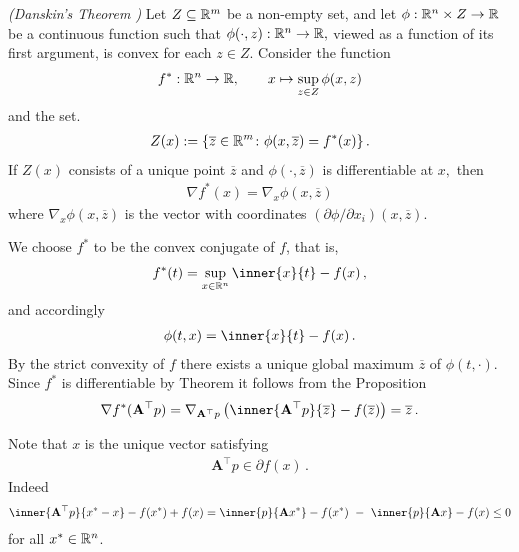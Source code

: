 \begin{proposition*}
  \emph{(Danskin's Theorem \cite[page 649]{Bertsekas2003})}
  Let 
  $
    Z \subseteq \mathbb{R}^m
  $
  be a non-empty set, 
  and let 
  $
    \phi :
    \mathbb{R}^n \times Z \to \mathbb{R}
  $
  be a continuous function such that
  $
    \phi(\cdot,z)
    :
    \mathbb{R}^n \to \mathbb{R},
  $
  viewed as a function of its first argument, 
  is convex for each 
  $
    z \in Z.
  $
  Consider the function
  \begin{gather}
    f^*:\mathbb{R}^n \to \mathbb{R}
    ,
    \qquad
    x\mapsto
    \sup_{z\in Z}
    \phi(x,z)
  \end{gather}
  and
  the set.
  \begin{gather}
    Z(x)
    :=
    \left\{ 
      \overline{z} \in \mathbb{R}^m
      \colon
      \phi(x, \overline{z})
      =
      f^*(x)
  \right\}
  .
  \end{gather}
  If $Z(x)$ consists of a unique point 
  $\overline{z}$
  and
  $
    \phi(\cdot, \overline{z})
  $
  is differentiable at $x,$
  then
  \begin{gather}
    \nabla f^*(x)
    =
    \nabla_x
    \phi(x,\overline{z})
  \end{gather}
  where 
  $
    \nabla_x
    \phi(x,\overline{z})
  $
  is the vector with coordinates
  $
    (\partial \phi / \partial x_i)
    (x,\overline{z})
  $.
\end{proposition*}
\begin{example*}
  We choose $f^*$ to be the convex conjugate of $f$, that is,
  \begin{gather}
    f^*(t)
    =
    \sup_{x\in\R^n}
    \inner{x}{t}-f(x)
    \,,
  \end{gather}
  and accordingly
  \begin{gather}
    \phi
    (t,x)
    =
    \inner{x}{t}-f(x)
    \,.
  \end{gather}
  By the strict convexity of $f$ there exists a unique
  global maximum $\overline{z}$ of $\phi(t,\cdot)$. 
  Since $f^*$ is differentiable by Theorem
  it follows from the Proposition
  \begin{gather}
    \nabla f^*(\mathbf{A}^\top p)
    =
    \nabla_{\mathbf{A}^\top p}
\left( 
    \inner
    {
      \mathbf{A}^\top p
    }
    {
      \overline{z}
    }
    -
    f
    (
      \overline{z}
    )
\right)
=
      \overline{z}
      \,.
  \end{gather}
\end{example*}
Note that $x$ is the unique vector satisfying 
\begin{gather}
  \mathbf{A}^\top p
  \in 
  \partial
  f(x)
  \,.
\end{gather}
Indeed
\begin{gather}
  \inner
  {\mathbf{A}^\top p}
  {x^*- x}
  -
  f(x^*)
  +
  f(x)
  =
  \inner{p}
  {\mathbf{A}x^*}
  -
  f(x^*)
  \ 
  -
  \ 
  \inner{p}
  {\mathbf{A}x}
  -
  f(x)
  \le 
  0
\end{gather}
for all
$x^*\in \mathbb{R}^n$.

